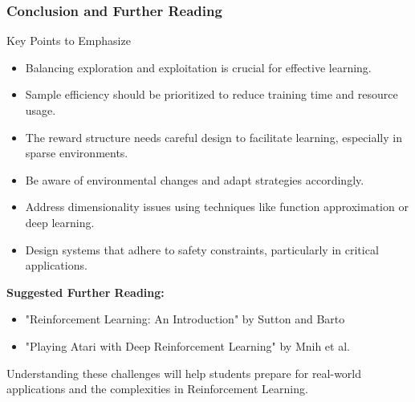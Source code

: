 \documentclass[aspectratio=169]{beamer}
\begin{document}
\begin{frame}[fragile]
  \frametitle{Conclusion and Further Reading}
  \begin{block}{Key Points to Emphasize}
    \begin{itemize}
      \item Balancing exploration and exploitation is crucial for effective learning.
      \item Sample efficiency should be prioritized to reduce training time and resource usage.
      \item The reward structure needs careful design to facilitate learning, especially in sparse environments.
      \item Be aware of environmental changes and adapt strategies accordingly.
      \item Address dimensionality issues using techniques like function approximation or deep learning.
      \item Design systems that adhere to safety constraints, particularly in critical applications.
    \end{itemize}
  \end{block}
  
  \textbf{Suggested Further Reading:}
  \begin{itemize}
    \item "Reinforcement Learning: An Introduction" by Sutton and Barto
    \item "Playing Atari with Deep Reinforcement Learning" by Mnih et al.
  \end{itemize}
  
  Understanding these challenges will help students prepare for real-world applications and the complexities in Reinforcement Learning.
\end{frame}
\end{document}
